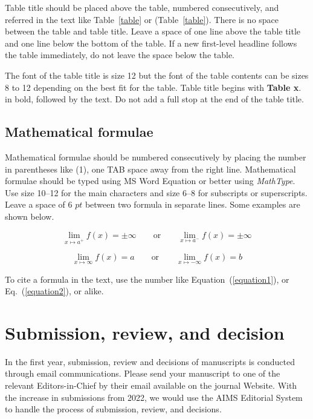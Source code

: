 \documentclass{aci}
\begin{document}
Table title should be placed above the table, numbered consecutively, and
referred in the text like Table~\ref{table} or (Table~\ref{table}). There is no
space between the table and table title. Leave a space of one line above the
table title and one line below the bottom of the table. If a new first-level
headline follows the table immediately, do not leave the space below the table.

The font of the table title is size 12 but the font of the table contents can be
sizes 8 to 12 depending on the best fit for the table. Table title begins with
\textbf{Table x}. in bold, followed by the text. Do not add a full stop at the
end of the table title.




\subsection{Mathematical formulae}
Mathematical formulae should be numbered consecutively by placing the number in
parentheses like (1), one TAB space away from the right line. Mathematical
formulae should be typed using MS Word Equation or better using \emph{MathType}.
Use size 10--12 for the main characters and size 6--8 for subscripts or
superscripts. Leave a space of 6 $pt$ between two formula in separate lines.
Some examples are shown below.

\begin{equation}
  \lim_{x \mapsto a^+ }f\left ( x \right )= \pm \infty \qquad \text{or} \qquad \lim_{x \mapsto a^- }f\left ( x \right )= \pm \infty
  \label{equation1}
\end{equation}

\begin{equation}
  \lim_{x \mapsto \infty }f\left ( x \right )=  a \qquad \text{or} \qquad \lim_{x \mapsto -\infty}f\left ( x \right )=  b
  \label{equation2}
\end{equation}

To cite a formula in the text, use the number like Equation~(\ref{equation1}),
or Eq.~(\ref{equation2}), or alike.

\section{Submission, review, and decision}
In the first year, submission, review and decisions of manuscripts is conducted
through email communications. Please send your manuscript to one of the relevant
Editors-in-Chief by their email available on the journal Website. With the
increase in submissions from 2022, we would use the AIMS Editorial System to
handle the process of submission, review, and decisions.
\end{document}
